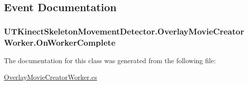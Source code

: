 \subsection{Event Documentation}
\hypertarget{classUTKinectSkeletonMovementDetector_1_1OverlayMovieCreatorWorker_a8287ec8e540ee2d64881ae833d70df20}{
\subsubsection[{On\-Worker\-Complete}]{ U\-T\-Kinect\-Skeleton\-Movement\-Detector.\-Overlay\-Movie\-Creator\-Worker.\-On\-Worker\-Complete}}\label{classUTKinectSkeletonMovementDetector_1_1OverlayMovieCreatorWorker_a8287ec8e540ee2d64881ae833d70df20}


The documentation for this class was generated from the following file\-:\begin{DoxyCompactItemize}
\item 
\hyperlink{OverlayMovieCreatorWorker_8cs}{Overlay\-Movie\-Creator\-Worker.\-cs}\end{DoxyCompactItemize}
